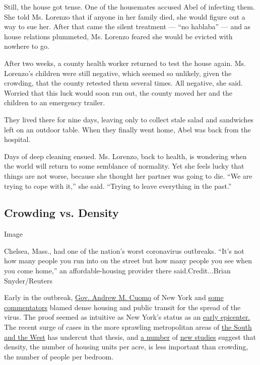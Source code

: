 Still, the house got tense. One of the housemates accused Abel of
infecting them. She told Ms. Lorenzo that if anyone in her family died,
she would figure out a way to sue her. After that came the silent
treatment --- ``no hablaba'' --- and as house relations plummeted, Ms.
Lorenzo feared she would be evicted with nowhere to go.

After two weeks, a county health worker returned to test the house
again. Ms. Lorenzo's children were still negative, which seemed so
unlikely, given the crowding, that the county retested them several
times. All negative, she said. Worried that this luck would soon run
out, the county moved her and the children to an emergency trailer.

They lived there for nine days, leaving only to collect stale salad and
sandwiches left on an outdoor table. When they finally went home, Abel
was back from the hospital.

Days of deep cleaning ensued. Ms. Lorenzo, back to health, is wondering
when the world will return to some semblance of normality. Yet she feels
lucky that things are not worse, because she thought her partner was
going to die. ``We are trying to cope with it,'' she said. ``Trying to
leave everything in the past.''

\hypertarget{crowding-vs-density}{%
\subsection{Crowding vs. Density}\label{crowding-vs-density}}

Image

Chelsea, Mass., had one of the nation's worst coronavirus outbreaks.
``It's not how many people you run into on the street but how many
people you see when you come home,'' an affordable-housing provider
there said.Credit...Brian Snyder/Reuters

Early in the outbreak,
\href{https://www.nytimes.com/2020/03/24/upshot/coronavirus-urban-density-risks.html}{Gov.
Andrew M. Cuomo} of New York and
\href{https://www.latimes.com/opinion/story/2020-04-26/coronavirus-cities-density-los-angeles-transit}{some
commentators} blamed dense housing and public transit for the spread of
the virus. The proof seemed as intuitive as New York's status as an
\href{https://www.nytimes.com/2020/03/22/nyregion/Coronavirus-new-York-epicenter.html}{early
epicenter.} The recent surge of cases in the more sprawling metropolitan
areas of
\href{https://www.nytimes.com/2020/06/14/us/coronavirus-united-states.html}{the
South and the West} has undercut that thesis, and
\href{https://jamanetwork.com/journals/jama/fullarticle/2767631?widget=personalizedcontent\&previousarticle=2768532}{a
number} of
\href{https://www.tandfonline.com/doi/full/10.1080/01944363.2020.1777891?scroll=top\&needAccess=true\&}{new
studies} suggest that density, the number of housing units per acre, is
less important than crowding, the number of people per bedroom.

